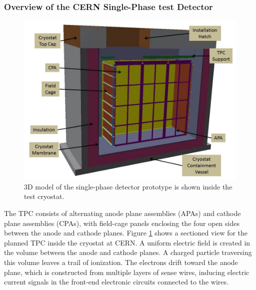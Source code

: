 \subsubsection{Overview of the CERN Single-Phase test Detector}
\begin{figure}[htb]
\centering
\begin{minipage}[b]{1.0\textwidth}
\begin{center}
\includegraphics[width=.75\textwidth]{./figures/2015-02-23-CDR-TPC-Figure.jpg}
\end{center}
\end{minipage}
\caption{\small 3D model of the single-phase detector prototype is shown inside the test cryostat.}
\label{fig:CERNdet-overview}
\end{figure}

The TPC consists of alternating anode plane assemblies (APAs) and cathode plane assemblies (CPAs), with field-cage panels enclosing the four open sides between the anode and cathode planes.  Figure  \ref{fig:CERNdet-overview} shows a sectioned view for the planned TPC inside the cryostat at CERN.  A uniform electric field is created in the volume between the anode and cathode planes. A charged particle traversing this volume leaves a trail of ionization. The electrons drift toward the anode plane, which is constructed from multiple layers of sense wires, inducing electric current signals in the front-end electronic circuits connected to the wires.

